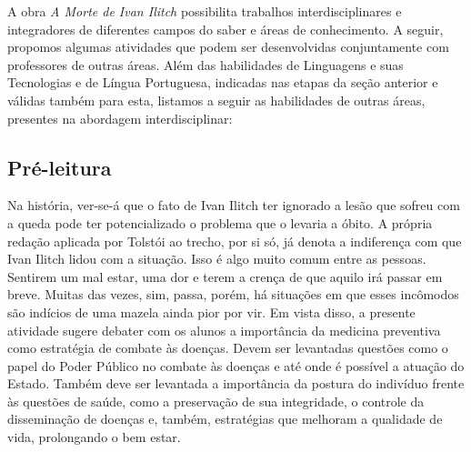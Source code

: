 \documentclass[12pt]{extarticle}
\begin{document}
A obra \emph{A Morte de Ivan Ilitch} possibilita trabalhos
interdisciplinares e integradores de diferentes campos do saber e áreas
de conhecimento. A seguir, propomos algumas atividades que podem ser
desenvolvidas conjuntamente com professores de outras áreas. Além das
habilidades de Linguagens e suas Tecnologias e de Língua Portuguesa,
indicadas nas etapas da seção anterior e válidas também para esta,
listamos a seguir as habilidades de outras áreas, presentes na abordagem
interdisciplinar:

\subsection{Pré-leitura}


Na história, ver-se-á que o fato de Ivan Ilitch ter ignorado
a lesão que sofreu com a queda pode ter potencializado o problema que o
levaria a óbito. A própria redação aplicada por Tolstói ao trecho, por
si só, já denota a indiferença com que Ivan Ilitch lidou com a situação.
Isso é algo muito comum entre as pessoas. Sentirem um mal estar, uma dor
e terem a crença de que aquilo irá passar em breve. Muitas das vezes,
sim, passa, porém, há situações em que esses incômodos são indícios de
uma mazela ainda pior por vir. Em vista disso, a presente atividade
sugere debater com os alunos a importância da medicina preventiva como
estratégia de combate às doenças. Devem ser levantadas questões como o
papel do Poder Público no combate às doenças e até onde é possível a
atuação do Estado. Também deve ser levantada a importância da postura do
indivíduo frente às questões de saúde, como a preservação de sua
integridade, o controle da disseminação de doenças e, também,
estratégias que melhoram a qualidade de vida, prolongando o bem estar.
\end{document}
